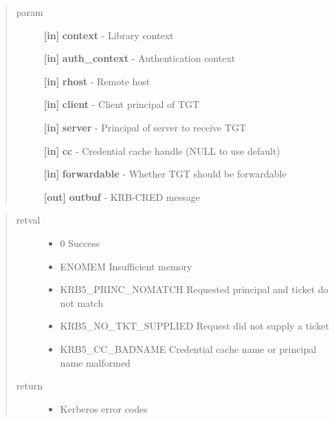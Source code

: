 \documentclass[letterpaper,10pt,english]{sphinxmanual}
\begin{document}
\begin{quote}\begin{description}
\item[{param}] \leavevmode
\textbf{{[}in{]}} \textbf{context} - Library context

\textbf{{[}in{]}} \textbf{auth\_context} - Authentication context

\textbf{{[}in{]}} \textbf{rhost} - Remote host

\textbf{{[}in{]}} \textbf{client} - Client principal of TGT

\textbf{{[}in{]}} \textbf{server} - Principal of server to receive TGT

\textbf{{[}in{]}} \textbf{cc} - Credential cache handle (NULL to use default)

\textbf{{[}in{]}} \textbf{forwardable} - Whether TGT should be forwardable

\textbf{{[}out{]}} \textbf{outbuf} - KRB-CRED message

\end{description}\end{quote}
\begin{quote}\begin{description}
\item[{retval}] \leavevmode\begin{itemize}
\item {} 
0   Success

\item {} 
ENOMEM   Insufficient memory

\item {} 
KRB5\_PRINC\_NOMATCH   Requested principal and ticket do not match

\item {} 
KRB5\_NO\_TKT\_SUPPLIED   Request did not supply a ticket

\item {} 
KRB5\_CC\_BADNAME   Credential cache name or principal name malformed

\end{itemize}

\item[{return}] \leavevmode\begin{itemize}
\item {} 
Kerberos error codes

\end{itemize}

\end{description}\end{quote}
\end{document}
